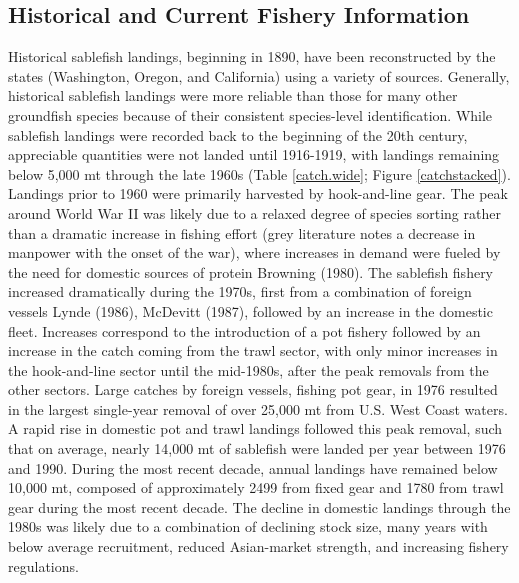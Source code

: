 \documentclass[11pt,
  english,
  a4paper,
]{article}
\begin{document}

\hypertarget{historical-and-current-fishery-information}{%
\subsection{Historical and Current Fishery Information}\label{historical-and-current-fishery-information}}

\leavevmode\tagmcend\tagstructend


Historical sablefish landings, beginning in 1890, have been reconstructed by the states (Washington, Oregon, and California) using a variety of sources. Generally, historical sablefish landings were more reliable than those for many other groundfish species because of their consistent species-level identification. While sablefish landings were recorded back to the beginning of the 20th century, appreciable quantities were not landed until 1916-1919, with landings remaining below 5,000 mt through the late 1960s (Table \ref{catch.wide}; Figure \ref{catchstacked}). Landings prior to 1960 were primarily harvested by hook-and-line gear. The peak around World War II was likely due to a relaxed degree of species sorting rather than a dramatic increase in fishing effort (grey literature notes a decrease in manpower with the onset of the war), where increases in demand were fueled by the need for domestic sources of protein {Browning (1980)\leavevmode\tagmcend\tagstructend}. The sablefish fishery increased dramatically during the 1970s, first from a combination of foreign vessels {Lynde (1986)\leavevmode\tagmcend\tagstructend}, {McDevitt (1987)\leavevmode\tagmcend\tagstructend}, followed by an increase in the domestic fleet. Increases correspond to the introduction of a pot fishery followed by an increase in the catch coming from the trawl sector, with only minor increases in the hook-and-line sector until the mid-1980s, after the peak removals from the other sectors. Large catches by foreign vessels, fishing pot gear, in 1976 resulted in the largest single-year removal of over 25,000 mt from U.S. West Coast waters. A rapid rise in domestic pot and trawl landings followed this peak removal, such that on average, nearly 14,000 mt of sablefish were landed per year between 1976 and 1990. During the most recent decade, annual landings have remained below 10,000 mt, composed of approximately 2499 from fixed gear and 1780 from trawl gear during the most recent decade. The decline in domestic landings through the 1980s was likely due to a combination of declining stock size, many years with below average recruitment, reduced Asian-market strength, and increasing fishery regulations.
\end{document}
